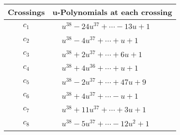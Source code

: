 \documentclass[1p]{elsarticle_modified}
\theoremstyle{definition}
\begin{document}
\begin{tabular}{m{50pt}|m{274pt}}
Crossings & \hspace{64pt}u-Polynomials at each crossing \\
\hline $$\begin{aligned}c_{1}\end{aligned}$$&$\begin{aligned}
&u^{38}-24 u^{37}+\cdots-13 u+1
\end{aligned}$\\
\hline $$\begin{aligned}c_{2}\end{aligned}$$&$\begin{aligned}
&u^{38}-4 u^{37}+\cdots+u+1
\end{aligned}$\\
\hline $$\begin{aligned}c_{3}\end{aligned}$$&$\begin{aligned}
&u^{38}+2 u^{37}+\cdots+6 u+1
\end{aligned}$\\
\hline $$\begin{aligned}c_{4}\end{aligned}$$&$\begin{aligned}
&u^{38}+4 u^{36}+\cdots+u+1
\end{aligned}$\\
\hline $$\begin{aligned}c_{5}\end{aligned}$$&$\begin{aligned}
&u^{38}-2 u^{37}+\cdots+47 u+9
\end{aligned}$\\
\hline $$\begin{aligned}c_{6}\end{aligned}$$&$\begin{aligned}
&u^{38}+4 u^{37}+\cdots- u+1
\end{aligned}$\\
\hline $$\begin{aligned}c_{7}\end{aligned}$$&$\begin{aligned}
&u^{38}+11 u^{37}+\cdots+3 u+1
\end{aligned}$\\
\hline $$\begin{aligned}c_{8}\end{aligned}$$&$\begin{aligned}
&u^{38}-5 u^{37}+\cdots-12 u^2+1
\end{aligned}$\\

\end{tabular}
\end{document}
